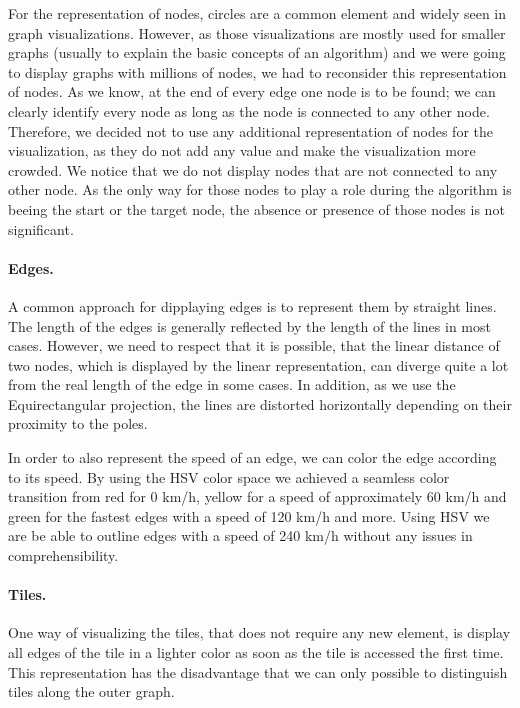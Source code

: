 \documentclass
[
    paper = a4,
    pagesize,
    12 pt,
    oneside,                       %
    open = right,
    DIV = calc,
    BCOR = 0 mm,                   %
    bibtotoc
]
{scrbook}
\begin{document}
For the representation of nodes, circles are a common element and widely seen in graph visualizations.
However, as those visualizations are mostly used for smaller graphs (usually to explain the basic concepts of an algorithm) and we were going to display graphs with millions of nodes, we had to reconsider this representation of nodes.
As we know, at the end of every edge one node is to be found; we can clearly identify every node as long as the node is connected to any other node.
Therefore, we decided not to use any additional representation of nodes for the visualization, as they do not add any value and make the visualization more crowded.
We notice that we do not display nodes that are not connected to any other node.
As the only way for those nodes to play a role during the algorithm is beeing the start or the target node, the absence or presence of those nodes is not significant.

\paragraph{Edges.}

A common approach for dipplaying edges is to represent them by straight lines.
The length of the edges is generally reflected by the length of the lines in most cases.
However, we need to respect that it is possible, that the linear distance of two nodes, which is displayed by the linear representation, can diverge quite a lot from the real length of the edge in some cases.
In addition, as we use the Equirectangular projection, the lines are distorted horizontally depending on their proximity to the poles.

In order to also represent the speed of an edge, we can color the edge according to its speed.
By using the HSV color space we achieved a seamless color transition from red for 0 km/h, yellow for a speed of approximately 60 km/h and green for the fastest edges with a speed of 120 km/h and more.
Using HSV we are be able to outline edges with a speed of 240 km/h without any issues in comprehensibility.


\paragraph{Tiles.}
One way of visualizing the tiles, that does not require any new element, is display all edges of the tile in a lighter color as soon as the tile is accessed the first time.
This representation has the disadvantage that we can only possible to distinguish tiles along the outer graph.
\end{document}
